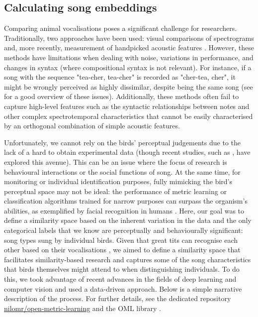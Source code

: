 \subsection{Calculating song embeddings}

Comparing animal vocalisations poses a significant challenge for researchers. Traditionally, two approaches have been used: visual comparisons of spectrograms and, more recently, measurement of handpicked acoustic features \parencite{goffinet2021}. However, these methods have limitations when dealing with noise, variations in performance, and changes in syntax (where compositional syntax is not relevant). For instance, if a song with the sequence "tea-cher, tea-cher" is recorded as "cher-tea, cher", it might be wrongly perceived as highly dissimilar, despite being the same song (see \cite{stowell2021, zandberg2022} for a good overview of these issues). Additionally, these methods often fail to capture high-level features such as the syntactic relationships between notes and other complex spectrotemporal characteristics that cannot be easily characterised by an orthogonal combination of simple acoustic features.

Unfortunately, we cannot rely on the birds' perceptual judgements due to the lack of a hard to obtain experimental data (though recent studies, such as \cite{morfi2021, zandberg2022}, have explored this avenue). This can be an issue where the focus of research is behavioural interactions or the social functions of song. At the same time, for monitoring or individual identification purposes, fully mimicking the bird's perceptual space may not be ideal: the performance of metric learning or classification algorithms trained for narrow purposes can surpass the organism's abilities, as exemplified by facial recognition in humans \parencite{lu2014}. Here, our goal was to define a similarity space based on the inherent variation in the data and the only categorical labels that we know are perceptually and behaviourally significant: song types sung by individual birds. Given that great tits can recognise each other based on their vocalisations \parencite{lind1996}, we aimed to define a similarity space that facilitates similarity-based research and captures some of the song characteristics that birds themselves might attend to when distinguishing individuals. To do this, we took advantage of recent advances in the fields of deep learning and computer vision and used a data-driven approach. Below is a simple narrative description of the process. For further details, see the dedicated repository \href{https://github.com/nilomr/open-metric-learning/tree/great-tit}{nilomr/open-metric-learning} and the OML library \parencite{shabanov2023}. 


